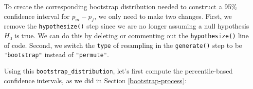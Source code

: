 \documentclass[
]{book}
\newenvironment{Shaded}{\begin{snugshade}}{\end{snugshade}}
\newcommand{\CommentTok}[1]{\textcolor[rgb]{0.56,0.35,0.01}{\textit{#1}}}
\newcommand{\DataTypeTok}[1]{\textcolor[rgb]{0.13,0.29,0.53}{#1}}
\newcommand{\DecValTok}[1]{\textcolor[rgb]{0.00,0.00,0.81}{#1}}
\newcommand{\FloatTok}[1]{\textcolor[rgb]{0.00,0.00,0.81}{#1}}
\newcommand{\KeywordTok}[1]{\textcolor[rgb]{0.13,0.29,0.53}{\textbf{#1}}}
\newcommand{\NormalTok}[1]{#1}
\newcommand{\OperatorTok}[1]{\textcolor[rgb]{0.81,0.36,0.00}{\textbf{#1}}}
\newcommand{\StringTok}[1]{\textcolor[rgb]{0.31,0.60,0.02}{#1}}
\begin{document}
To create the corresponding bootstrap distribution needed to construct a 95\% confidence interval for \(p_{m} - p_{f}\), we only need to make two changes.  First, we remove the \texttt{hypothesize()} step since we are no longer assuming a null hypothesis \(H_0\) is true. We can do this by deleting or commenting out the \texttt{hypothesize()} line of code. Second, we switch the \texttt{type} of resampling in the \texttt{generate()} step to be \texttt{"bootstrap"} instead of \texttt{"permute"}.

\begin{Shaded}
\end{Shaded}

Using this \texttt{bootstrap\_distribution}, let's first compute the percentile-based confidence intervals, as we did in Section \ref{bootstrap-process}:

\begin{Shaded}
\end{Shaded}
\end{document}
